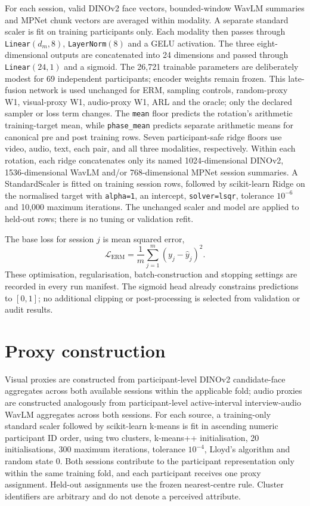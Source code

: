 For each session, valid DINOv2 face vectors, bounded-window WavLM summaries and MPNet chunk
vectors are averaged within modality. A separate standard scaler is fit on training participants
only. Each modality then passes through \texttt{Linear}$(d_m,8)$, \texttt{LayerNorm}$(8)$ and a
GELU activation. The three eight-dimensional outputs are concatenated into 24 dimensions and
passed through \texttt{Linear}$(24,1)$ and a sigmoid. The 26,721 trainable parameters are
deliberately modest for 69 independent participants; encoder weights remain
frozen. This late-fusion network is used unchanged for ERM, sampling controls, random-proxy W1,
visual-proxy W1, audio-proxy W1, ARL and the oracle; only the declared sampler or loss term changes.
The \texttt{mean} floor predicts the rotation's arithmetic training-target mean, while
\texttt{phase\_mean} predicts separate arithmetic means for canonical pre and post training rows.
Seven participant-safe ridge floors use video, audio, text, each pair, and all three modalities,
respectively. Within each rotation, each ridge concatenates only its named 1024-dimensional
DINOv2, 1536-dimensional WavLM and/or 768-dimensional MPNet session summaries. A StandardScaler is
fitted on training session rows, followed by scikit-learn Ridge on the normalised target with
\texttt{alpha=1}, an intercept, \texttt{solver=lsqr}, tolerance $10^{-6}$ and 10,000 maximum
iterations. The unchanged scaler and model are applied to held-out rows; there is no tuning or
validation refit.

The base loss for session $j$ is mean squared error,
\begin{equation}
    \mathcal{L}_{\mathrm{ERM}}=\frac{1}{m}\sum_{j=1}^{m}(y_j-\hat y_j)^2.
\end{equation}
These optimisation, regularisation, batch-construction and stopping settings are recorded in every
run manifest. The sigmoid head already constrains predictions to $[0,1]$; no additional clipping
or post-processing is selected from validation or audit results.

\section{Proxy construction}

\begin{sloppypar}
Visual proxies are constructed from participant-level DINOv2 candidate-face aggregates across both
available sessions within the applicable fold; audio proxies are constructed analogously from
participant-level active-interval interview-audio WavLM aggregates across both sessions. For each source, a
training-only standard scaler followed by scikit-learn k-means is fit in ascending numeric
participant ID order, using two clusters, k-means++ initialisation, 20 initialisations, 300 maximum
iterations, tolerance $10^{-4}$, Lloyd's algorithm and random state 0. Both sessions contribute to the participant representation only within the same training
fold, and each participant receives one proxy assignment. Held-out assignments use the frozen
nearest-centre rule. Cluster identifiers are arbitrary and do not denote a perceived attribute.
\end{sloppypar}

